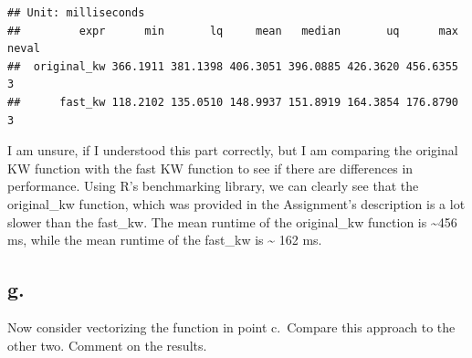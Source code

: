 \documentclass[
]{article}
\newenvironment{Shaded}{\begin{snugshade}}{\end{snugshade}}
\newcommand{\AttributeTok}[1]{\textcolor[rgb]{0.13,0.29,0.53}{#1}}
\newcommand{\ControlFlowTok}[1]{\textcolor[rgb]{0.13,0.29,0.53}{\textbf{#1}}}
\newcommand{\DecValTok}[1]{\textcolor[rgb]{0.00,0.00,0.81}{#1}}
\newcommand{\FunctionTok}[1]{\textcolor[rgb]{0.13,0.29,0.53}{\textbf{#1}}}
\newcommand{\NormalTok}[1]{#1}
\newcommand{\OtherTok}[1]{\textcolor[rgb]{0.56,0.35,0.01}{#1}}
\newcommand{\SpecialCharTok}[1]{\textcolor[rgb]{0.81,0.36,0.00}{\textbf{#1}}}
\newcommand{\StringTok}[1]{\textcolor[rgb]{0.31,0.60,0.02}{#1}}
\begin{document}
\begin{Shaded}
\end{Shaded}

\begin{verbatim}
## Unit: milliseconds
##         expr      min       lq     mean   median       uq      max neval
##  original_kw 366.1911 381.1398 406.3051 396.0885 426.3620 456.6355     3
##      fast_kw 118.2102 135.0510 148.9937 151.8919 164.3854 176.8790     3
\end{verbatim}

I am unsure, if I understood this part correctly, but I am comparing the
original KW function with the fast KW function to see if there are
differences in performance. Using R's benchmarking library, we can
clearly see that the original\_kw function, which was provided in the
Assignment's description is a lot slower than the fast\_kw. The mean
runtime of the original\_kw function is \textasciitilde456 ms, while the
mean runtime of the fast\_kw is \textasciitilde{} 162 ms.

\subsection{g.}\label{g.}

Now consider vectorizing the function in point c.~Compare this approach
to the other two. Comment on the results.
\end{document}
